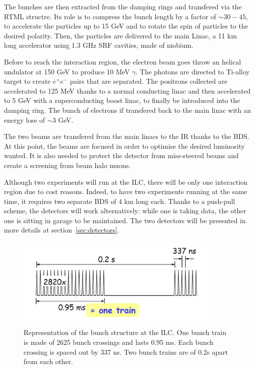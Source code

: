     The bunches are then extracted from the damping rings and transfered via the \gls{RTML} structre.
    Its role is to compress the bunch length by a factor of $\sim 30-45$, to accelerate the particles up to 15 GeV and to rotate the spin of particles to the desired polarity.
    Then, the particles are delivered to the main Linac, a 11 km long accelerator using 1.3 GHz \acrshort{SRF} cavities, made of niobium.

    Before to reach the interaction region, the electron beam goes throw an helical undulator at 150 GeV to produce 10 MeV $\gamma$.
    The photons are directed to Ti-alloy target to create $e^+e^-$ pairs that are separated.
    The positrons collected are accelerated to 125 MeV thanks to a normal conducting linac and then accelerated to 5 GeV with a superconducting boost linac, to finally be introduced into the damping ring.
    The bunch of electrons if transfered back to the main linac with an energy lose of $\sim 3$ GeV.

    The two beams are transfered from the main linacs to the \acrshort{IR} thanks to the \acrshort{BDS}.
    At this point, the beams are focused in order to optimise the desired luminosity wanted.
    It is also needed to protect the detector from miss-steered beams and create a screening from beam halo muons.

    Although two experiments will run at the \acrshort{ILC}, there will be only one interaction region due to cost reasons.
    Indeed, to have two experiments running at the same time, it requires two separate \acrshort{BDS} of 4 km long each.
    Thanks to a push-pull scheme, the detectors will work alternatively: while one is taking data, the other one is sitting in garage to be maintained.
    The two detectors will be presented in more details at section~\ref{sec:detectors}.
    
    \begin{figure}
      \centering
      \includegraphics[width = 10cm]{Pictures/bunch.png}
      \caption{Representation of the bunch structure at the ILC. One bunch train is made of 2625 bunch crossings and lasts 0.95 ms. Each bunch crossing is spaced out by 337 ns. Two bunch trains are of 0.2s apart from each other.}
      \label{fig:bunches}
    \end{figure}

